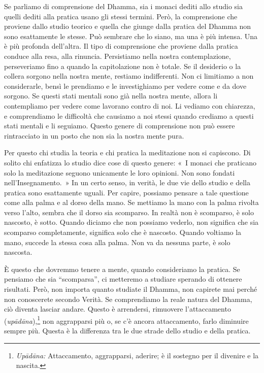Se parliamo di comprensione del Dhamma, sia i monaci dediti allo studio
sia quelli dediti alla pratica usano gli stessi termini. Però, la
comprensione che proviene dallo studio teorico e quella che giunge dalla
pratica del Dhamma non sono esattamente le stesse. Può sembrare che lo
siano, ma una è più intensa. Una è più profonda dell'altra. Il tipo di
comprensione che proviene dalla pratica conduce alla resa, alla
rinuncia. Persistiamo nella nostra contemplazione, perseveriamo fino a
quando la capitolazione non è totale. Se il desiderio o la collera
sorgono nella nostra mente, restiamo indifferenti. Non ci limitiamo a
non considerarle, bensì le prendiamo e le investighiamo per vedere come
e da dove sorgono. Se questi stati mentali sono già nella nostra mente,
allora li contempliamo per vedere come lavorano contro di noi. Li
vediamo con chiarezza, e comprendiamo le difficoltà che causiamo a noi
stessi quando crediamo a questi stati mentali e li seguiamo. Questo
genere di comprensione non può essere rintracciato in un posto che non
sia la nostra mente pura.

Per questo chi studia la teoria e chi pratica la meditazione non si
capiscono. Di solito chi enfatizza lo studio dice cose di questo genere:
«~I monaci che praticano solo la meditazione seguono unicamente le loro
opinioni. Non sono fondati nell'Insegnamento.~» In un certo senso, in
verità, le due vie dello studio e della pratica sono esattamente uguali.
Per capire, possiamo pensare a tale questione come alla palma e al dorso
della mano. Se mettiamo la mano con la palma rivolta verso l'alto,
sembra che il dorso sia scomparso. In realtà non è scomparso, è solo
nascosto, è sotto. Quando diciamo che non possiamo vederlo, non
significa che sia scomparso completamente, significa solo che è
nascosto. Quando voltiamo la mano, succede la stessa cosa alla palma.
Non va da nessuna parte, è solo nascosta.

È questo che dovremmo tenere a mente, quando consideriamo la pratica. Se
pensiamo che sia ``scomparsa'', ci metteremo a studiare sperando di
ottenere risultati. Però, non importa quanto studiate il Dhamma, non
capirete mai perché non conoscerete secondo Verità. Se comprendiamo la
reale natura del Dhamma, ciò diventa lasciar andare. Questo è
arrendersi, rimuovere l'attaccamento (\emph{upādāna}),\footnote{\emph{Upādāna:}
  Attaccamento, aggrapparsi, aderire; è il sostegno per il divenire e la
  nascita.} non aggrapparsi più o, se c'è ancora attaccamento, farlo
diminuire sempre più. Questa è la differenza tra le due strade dello
studio e della pratica.

